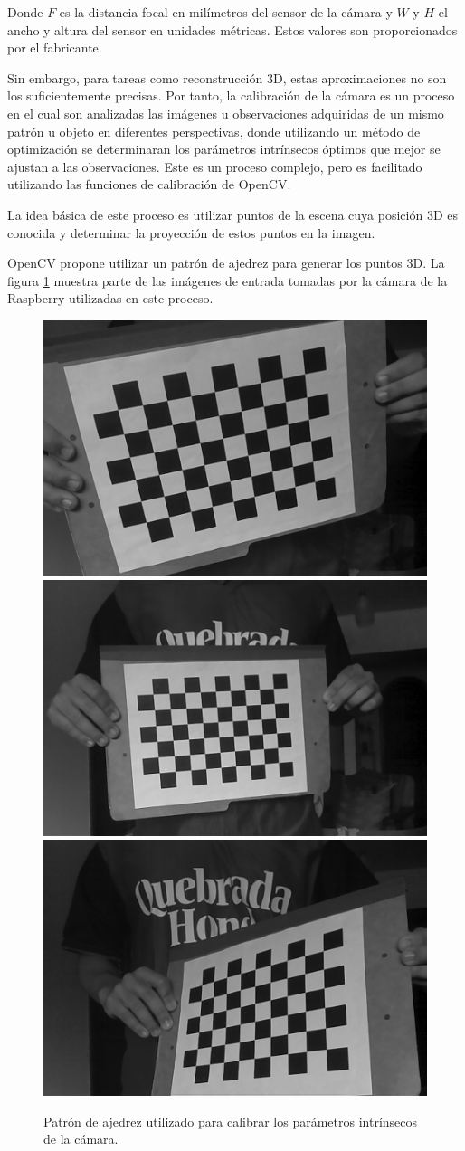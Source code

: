 Donde $F$ es la distancia focal en milímetros del sensor de la cámara y $W$ y $H$ el ancho y altura del sensor en unidades métricas. Estos valores son proporcionados por el fabricante.

Sin embargo, para tareas como reconstrucción 3D, estas aproximaciones no son los suficientemente precisas. Por tanto, la calibración de la cámara es un proceso en el cual son analizadas las imágenes u observaciones  adquiridas de un mismo patrón u objeto en diferentes perspectivas, donde utilizando un método de optimización se determinaran los parámetros intrínsecos óptimos  que mejor se ajustan a las observaciones. Este es un proceso complejo, pero es facilitado utilizando las funciones de calibración de OpenCV.



La idea básica de este proceso es utilizar puntos de la escena cuya posición 3D es conocida y determinar la proyección de estos puntos en la imagen.

OpenCV propone utilizar un patrón de ajedrez para generar los puntos 3D. La figura \ref{imagen:CalibracionCamara} muestra parte de las imágenes de entrada tomadas por  la cámara de la Raspberry utilizadas en este proceso. 

\begin{figure}[H]
	\centering
	\includegraphics[width=0.3\linewidth]{imagenes/prototipo/Calibracion/frame_010}
	\includegraphics[width=0.3\linewidth]{imagenes/prototipo/Calibracion/frame_021}			\includegraphics[width=0.3\linewidth]{imagenes/prototipo/Calibracion/frame_031}
	\caption{Patrón de ajedrez utilizado para calibrar los parámetros intrínsecos de la  cámara.}
	\label{imagen:CalibracionCamara}
\end{figure}

